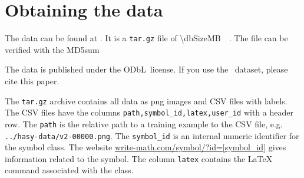 
\appendix
\section*{Obtaining the data}
The data can be found at \dbDownloadURL. It is a \verb+tar.gz+ file of
\SI{\dbSizeMB}{\mega\byte}. The file can be verified with the MD5sum

\texttt{\dbMDfivesum}

The data is published under the ODbL~license. If you use
the \dbName~dataset, please cite this paper.

The \verb+tar.gz+ archive contains all data as png images and CSV files with
labels. The CSV files have the
columns \verb+path,symbol_id,latex,user_id+ with a header row. The \verb+path+ is the
relative path to a training example to the CSV file, e.g. \verb+../hasy-data/v2-00000.png+. The
\verb+symbol_id+ is an internal numeric identifier for the symbol class. The
website \href{http://write-math.com/symbol/?id=968}{write-math.com/symbol/?id=[symbol\_id]}
gives information related to the symbol. The column \verb+latex+ contains the
\LaTeX{} command associated with the class.
\onecolumn

\twocolumn